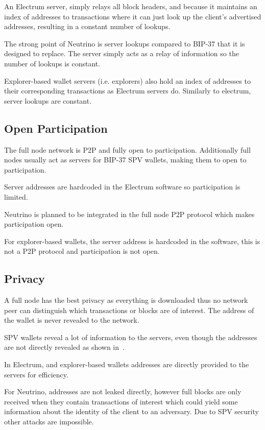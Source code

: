 An Electrum server, simply relays all block headers, and because it maintains an index of addresses to transactions where it can just look up the client's advertised addresses, resulting in a constant number of lookups.

The strong point of Neutrino is server lookups compared to BIP-37 that it is designed to replace. The server simply acts as a relay of information so the number of lookups is constant.

Explorer-based wallet servers (i.e. explorers) also hold an index of addresses to their corresponding transactions as Electrum servers do. Similarly to electrum, server lookups are constant.

\subsection{Open Participation}
The full node network is P2P and fully open to participation.  Additionally full nodes usually act as servers for BIP-37 SPV wallets, making them to open to participation.

Server addresses are hardcoded in the Electrum software so participation is limited.

Neutrino is planned to be integrated in the full node P2P protocol which makes participation open.

For explorer-based wallets, the server address is hardcoded in the software, this is not a P2P protocol and participation is not open.

\subsection{Privacy}
A full node has the best privacy as everything is downloaded thus no network peer can distinguish which transactions or blocks are of interest. The address of the wallet is never revealed to the network. 

SPV wallets reveal a lot of information to the servers, even though the addresses are not directly revealed as shown in~\cite{gervais2014privacy}.


In Electrum, and explorer-based wallets addresses are directly provided to the servers for efficiency.

For Neutrino, addresses are not leaked directly, however full blocks are only received when they contain transactions of interest which could yield some information about the identity of the client to an adversary. Due to SPV security other attacks are impossible.

